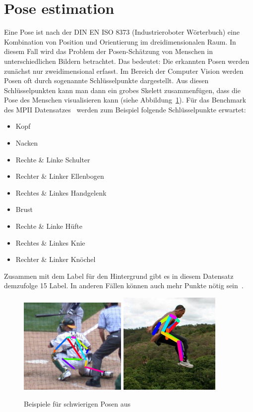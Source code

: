 \documentclass[journal, a4paper]{IEEEtran}
\begin{document}
\section{Pose estimation} \label{sec:pose_estimation}
	Eine Pose ist nach der DIN EN ISO 8373 (Industrieroboter Wörterbuch) eine Kombination von Position und Orientierung im dreidimensionalen Raum. In diesem Fall wird das Problem der Posen-Schätzung von Menschen in unterschiedlichen Bildern betrachtet. Das bedeutet: Die erkannten Posen werden zunächst nur zweidimensional erfasst. Im Bereich der Computer Vision werden Posen oft durch sogenannte Schlüsselpunkte dargestellt. Aus diesen Schlüsselpunkten kann man dann ein grobes Skelett zusammenfügen, dass die Pose des Menschen visualisieren kann (siehe Abbildung~\ref{fig:hard_pose}).
        Für das Benchmark des MPII Datensatzes~\cite{MPII} 
        werden zum Beispiel folgende Schlüsselpunkte erwartet:
        \begin{itemize}
        \item Kopf 
        \item Nacken
        \item Rechte \& Linke Schulter
        \item Rechter \& Linker Ellenbogen
        \item Rechtes \& Linkes Handgelenk
        \item Brust
        \item Rechte \& Linke Hüfte
        \item Rechtes \& Linkes Knie
        \item Rechter \& Linker Knöchel
        \end{itemize}
        Zusammen mit dem Label für den Hintergrund gibt es in diesem Datensatz demzufolge 15 Label. In anderen Fällen können auch mehr Punkte nötig sein~\cite{lin2014microsoft}.
        \begin{figure}[!hbt]
                \includegraphics[width=0.4\columnwidth]{hardpose_1.png}
                \includegraphics[width=0.35\columnwidth]{hardpose_2.png}
                \caption{Beispiele für schwierigen Posen aus~\cite{toshev2014deeppose}}
                \label{fig:hard_pose}
        \end{figure}
\end{document}
